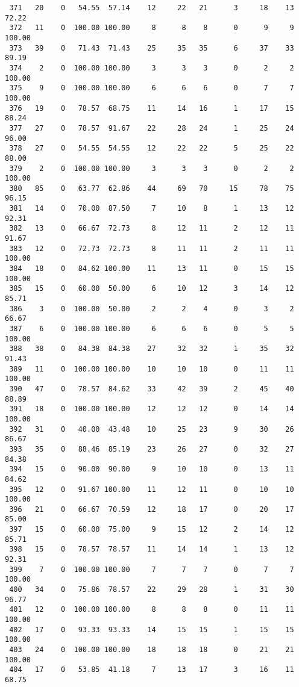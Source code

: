 \begin{verbatim}
 371   20    0   54.55  57.14    12     22   21      3     18    13    72.22
 372   11    0  100.00 100.00     8      8    8      0      9     9   100.00
 373   39    0   71.43  71.43    25     35   35      6     37    33    89.19
 374    2    0  100.00 100.00     3      3    3      0      2     2   100.00
 375    9    0  100.00 100.00     6      6    6      0      7     7   100.00
 376   19    0   78.57  68.75    11     14   16      1     17    15    88.24
 377   27    0   78.57  91.67    22     28   24      1     25    24    96.00
 378   27    0   54.55  54.55    12     22   22      5     25    22    88.00
 379    2    0  100.00 100.00     3      3    3      0      2     2   100.00
 380   85    0   63.77  62.86    44     69   70     15     78    75    96.15
 381   14    0   70.00  87.50     7     10    8      1     13    12    92.31
 382   13    0   66.67  72.73     8     12   11      2     12    11    91.67
 383   12    0   72.73  72.73     8     11   11      2     11    11   100.00
 384   18    0   84.62 100.00    11     13   11      0     15    15   100.00
 385   15    0   60.00  50.00     6     10   12      3     14    12    85.71
 386    3    0  100.00  50.00     2      2    4      0      3     2    66.67
 387    6    0  100.00 100.00     6      6    6      0      5     5   100.00
 388   38    0   84.38  84.38    27     32   32      1     35    32    91.43
 389   11    0  100.00 100.00    10     10   10      0     11    11   100.00
 390   47    0   78.57  84.62    33     42   39      2     45    40    88.89
 391   18    0  100.00 100.00    12     12   12      0     14    14   100.00
 392   31    0   40.00  43.48    10     25   23      9     30    26    86.67
 393   35    0   88.46  85.19    23     26   27      0     32    27    84.38
 394   15    0   90.00  90.00     9     10   10      0     13    11    84.62
 395   12    0   91.67 100.00    11     12   11      0     10    10   100.00
 396   21    0   66.67  70.59    12     18   17      0     20    17    85.00
 397   15    0   60.00  75.00     9     15   12      2     14    12    85.71
 398   15    0   78.57  78.57    11     14   14      1     13    12    92.31
 399    7    0  100.00 100.00     7      7    7      0      7     7   100.00
 400   34    0   75.86  78.57    22     29   28      1     31    30    96.77
 401   12    0  100.00 100.00     8      8    8      0     11    11   100.00
 402   17    0   93.33  93.33    14     15   15      1     15    15   100.00
 403   24    0  100.00 100.00    18     18   18      0     21    21   100.00
 404   17    0   53.85  41.18     7     13   17      3     16    11    68.75

\end{verbatim}
